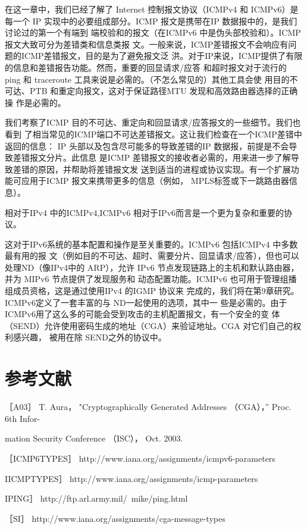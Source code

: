 在这一章中，我们已经了解了 Internet 控制报文协议（ICMPv4 和 ICMPv6）是每一个 IP
实现中的必要组成部分。ICMP 报文是携带在IP 数据报中的，是我们讨论过的第一个有端到
端校验和的报文（在ICMPv6 中是伪头部校验和）。ICMP报文大致可分为差错类和信息类报
文。一般来说，ICMP差错报文不会响应有问题的ICMP差错报文，目的是为了避免报文泛
洪。对于IP来说，ICMP提供了有限的信息和差错报告功能。然而，重要的回显请求/应答
和超时报文对于流行的 ping 和 traceroute 工具来说是必需的。（不怎么常见的）其他工具会使
用目的不可达、PTB 和重定向报文，这对于保证路径MTU 发现和高效路由器选择的正确操
作是必需的。

我们考察了ICMP 目的不可达、重定向和回显请求/应答报文的一些细节。我们也看到
了相当常见的ICMP端口不可达差错报文。这让我们检查在一个ICMP差错中返回的信息：
IP 头部以及包含尽可能多的导致差错的IP 数据报，前提是不会导致差错报文分片。此信息
是ICMP 差错报文的接收者必需的，用来进一步了解导致差错的原因，并帮助将差错报文发
送到适当的进程或协议实现。有一个扩展功能可应用于ICMP 报文来携带更多的信息（例如，
MPLS标签或下一跳路由器信息）。

相对于IPv4 中的ICMPv4,ICMPv6 相对于IPv6而言是一个更为复杂和重要的协议。

这对于IPv6系统的基本配置和操作是至关重要的。ICMPv6 包括ICMPv4 中多数最有用的报
文（例如目的不可达、超时、需要分片、回显请求/应答），但也可以处理ND（像IPv4中的
ARP），允许 IPv6 节点发现链路上的主机和默认路由器，并为 MIPv6 节点提供了发现服务和
动态配置功能。ICMPv6 也可用于管理组播组成员资格，这是通过使用IPv4 的IGMP 协议来
完成的，我们将在第9章研究。ICMPv6定义了一套丰富的与 ND一起使用的选项，其中一
些是必需的。由于ICMPv6用了这么多的可能会受到攻击的主机配置报文，有一个安全的变
体（SEND）允许使用密码生成的地址（CGA）来验证地址。CGA 对它们自己的权利感兴趣，
被用在除 SEND之外的协议中。

\section{参考文献}
［A03］ T. Aura， "Cryptographically Generated Addresses （CGA），” Proc. 6th Infor-

mation Security Conference （ISC）， Oct. 2003.

［ICMP6TYPES］ http://www.iana.org/assignments/icmpv6-parameters

IICMPTYPES］ http://www.iana.org/assignments/icmp-parameters

IPING］ http://ftp.arl.army.mil/~mike/ping.html

［SI］ http://www.iana.org/assignments/cga-message-types